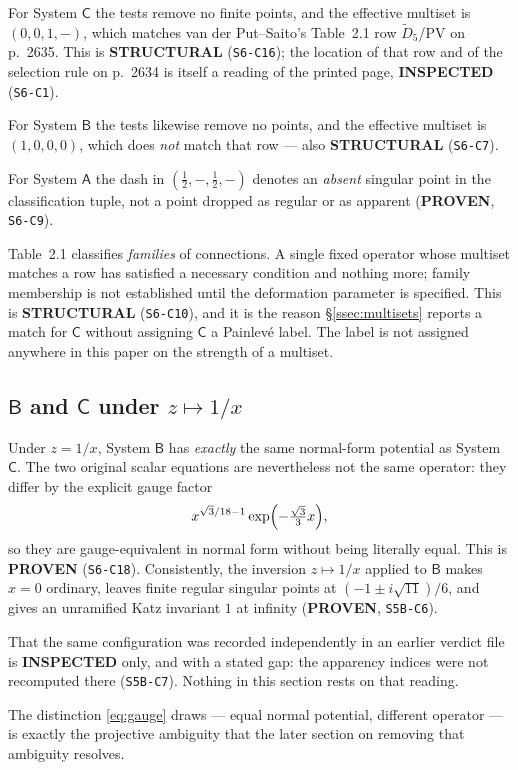For System $\mathsf C$ the tests remove no finite points, and the effective
multiset is $(0,0,1,-)$, which matches van der Put--Saito's Table~2.1 row
$\widetilde D_5$/PV on p.~2635. This is \textbf{STRUCTURAL}
(\texttt{S6-C16}); the location of that row and of the selection rule on
p.~2634 is itself a reading of the printed page, \textbf{INSPECTED}
(\texttt{S6-C1}).

For System $\mathsf B$ the tests likewise remove no points, and the effective
multiset is $(1,0,0,0)$, which does \emph{not} match that row --- also
\textbf{STRUCTURAL} (\texttt{S6-C7}).

For System $\mathsf A$ the dash in $(\tfrac12,-,\tfrac12,-)$ denotes an
\emph{absent} singular point in the classification tuple, not a point dropped
as regular or as apparent (\textbf{PROVEN}, \texttt{S6-C9}).

\begin{remark}
\label{rem:necessary}
Table~2.1 classifies \emph{families} of connections. A single fixed operator
whose multiset matches a row has satisfied a necessary condition and nothing
more; family membership is not established until the deformation parameter is
specified. This is \textbf{STRUCTURAL} (\texttt{S6-C10}), and it is the reason
\S\ref{ssec:multisets} reports a match for $\mathsf C$ without assigning
$\mathsf C$ a Painlev\'e label. The label is not assigned anywhere in this
paper on the strength of a multiset.
\end{remark}

\subsection{\texorpdfstring{$\mathsf B$ and $\mathsf C$ under $z\mapsto1/x$}%
{B and C under z to 1/x}}\label{ssec:BC}

Under $z=1/x$, System $\mathsf B$ has \emph{exactly} the same normal-form
potential as System $\mathsf C$. The two original scalar equations are
nevertheless not the same operator: they differ by the explicit gauge factor
\begin{equation}\label{eq:gauge}
  x^{\sqrt3/18-1}\exp\Bigl(-\tfrac{\sqrt3}{3}x\Bigr),
\end{equation}
so they are gauge-equivalent in normal form without being literally equal.
This is \textbf{PROVEN} (\texttt{S6-C18}). Consistently, the inversion
$z\mapsto1/x$ applied to $\mathsf B$ makes $x=0$ ordinary, leaves finite
regular singular points at $(-1\pm i\sqrt{11})/6$, and gives an unramified Katz
invariant $1$ at infinity (\textbf{PROVEN}, \texttt{S5B-C6}).

That the same configuration was recorded independently in an earlier verdict
file is \textbf{INSPECTED} only, and with a stated gap: the apparency indices
were not recomputed there (\texttt{S5B-C7}). Nothing in this section rests on
that reading.

\medskip
\noindent
The distinction \eqref{eq:gauge} draws --- equal normal potential, different
operator --- is exactly the projective ambiguity that the later section on
removing that ambiguity resolves.
